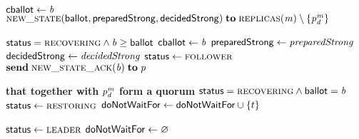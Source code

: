 \begin{algorithm*}[t]
\begin{algorithmic}[1]
      \hStatex
      \State ${\sf cballot} \gets \mathit{b}$
        \label{line:newleaderack-cballot}
      \State \send $\textsc{new\_state}({\sf ballot}, {\sf preparedStrong}, {\sf decidedStrong})
        \;{\bf to}\; \textsc{replicas}(\mathit{m}) \setminus \{\mathit{p}^{\mathit{m}}_{\mathit{d}}\}$
        \label{line:newleaderack-call-newstate}
    \EndWhenRcv

    \Statex
    \WhenRcv[\newstate($\ballotvar, \preparedstrongvar, \decidedstrongvar$) \from $\pvar$]
      \label{line:function-newstate}
      \State \pre ${\sf status} = \textsc{recovering} \land \mathit{b} \ge {\sf ballot}$
        \label{line:newstate-precondition}
      \hStatex
      \State ${\sf cballot} \gets \mathit{b}$
        \label{line:newstate-cballot}
      \State ${\sf preparedStrong} \gets \mathit{preparedStrong}$
        \label{line:newstate-preparedstrong}
      \State ${\sf decidedStrong} \gets \mathit{decidedStrong}$
        \label{line:newstate-decidedstrong}
      \State ${\sf status} \gets \textsc{follower}$
        \label{line:newstate-status}
      \State $\send \Call{\newstateack}{\ballotvar} \sendto \pvar$
        \label{line:newstate-call-newstateack}
    \EndWhenRcv

    \Statex
      \textbf{that together with} $\mathit{p}^{\mathit{m}}_{\mathit{d}}$ \textbf{form a quorum}
      \State \pre ${\sf status} = \textsc{recovering} \land {\sf ballot} = \mathit{b}$
      \hStatex
      \State ${\sf status} \gets \textsc{restoring}$
        \If{$\Call{\certify}{\restoring, \tidvar, \wbuffvar, \rsetvar, \snapvc, \lccolor{\lcvar}} = \unknowntx$}
          \State ${\sf doNotWaitFor} \gets {\sf doNotWaitFor} \cup \{t\}$
        \EndIf
    \EndFor
    \EndWhenRcv

    \Statex
    \Upon[$\preparedstrong \subseteq \doNotWaitFor \land \statusVar = \restoring$]
      \State ${\sf status} \gets \textsc{leader}$
      \State ${\sf doNotWaitFor} \gets \varnothing$
    \EndUpon
  \end{algorithmic}
\end{algorithm*}
